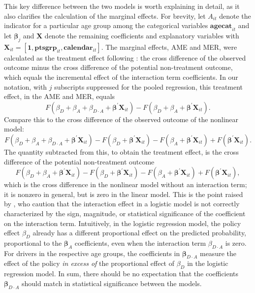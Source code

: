 This key difference between the two models is worth explaining in detail, 
as it also clarifies the calculation of the marginal effects. 
%
For brevity, let $A_{it}$ denote the indicator for a particular age group 
among the categorical variables $\bm{agecat}_{it}$
and let $\bm{\beta}_j$ and $\bm{X}$ denote 
the remaining coefficients and explanatory variables 
with $\bm{X}_{it} = [\bm{1}, \bm{ptsgrp}_{it}, \bm{calendar}_{it}]$. 
% 
The marginal effects, AME and MER, 
were calculated as the treatment effect following \citet{puhani2012}:
the cross difference of the observed outcome 
minus the cross difference of the potential non-treatment outcome, 
which equals the incremental effect of the interaction term coefficients. 
In our notation, with $j$ subscripts suppressed for the pooled regression, 
this treatment effect, in the AME and MER, equals
$$
	F(\beta_D + \beta_A + \beta_{D\cdot A} + \bm{\beta}^\prime \bm{X}_{it})
		- F(\beta_D + \beta_A + \bm{\beta}^\prime \bm{X}_{it}).
$$
Compare this to the cross difference of the observed outcome of the nonlinear model: 
$$
	F(\beta_D + \beta_A + \beta_{D\cdot A} + \bm{\beta}^\prime \bm{X}_{it})
		- F(\beta_D + \bm{\beta}^\prime \bm{X}_{it})
		- F(\beta_A + \bm{\beta}^\prime \bm{X}_{it})
		+ F(\bm{\beta}^\prime \bm{X}_{it}).
$$
The quantity subtracted from this, to obtain the treatment effect, 
is the cross difference of the potential non-treatment outcome 
$$
	F(\beta_D + \beta_A + \bm{\beta}^\prime \bm{X}_{it})
		- F(\beta_D + \bm{\beta}^\prime \bm{X}_{it})
		- F(\beta_A + \bm{\beta}^\prime \bm{X}_{it})
		+ F(\bm{\beta}^\prime \bm{X}_{it}), 
$$
which is the cross difference in the nonlinear model 
without an interaction term; it is nonzero in general, 
but is zero in the linear model. 
% 
This is the point raised by  
\citet{ainorton2003}, who caution that 
the interaction effect in a logistic model 
is not correctly characterized by the
sign, magnitude, or statistical significance of the coefficient on the
interaction term.
Intuitively, in the logistic regression model, the policy effect $\beta_D$
already has a different proportional effect on the predicted probability, 
proportional to the $\bm{\beta}_A$ coefficients, 
even when the interaction term $\beta_{D\cdot A}$ is zero. 
For drivers in the respective age groups,
the coefficients in $\bm{\beta}_{D\cdot A}$ measure the effect of the policy
\emph{in excess of} the proportional effect of $\beta_D$
in the logistic regression model. 
In sum, there should be no expectation that the coefficients $\bm{\beta}_{D\cdot A}$
should match in statistical significance between the models. 

